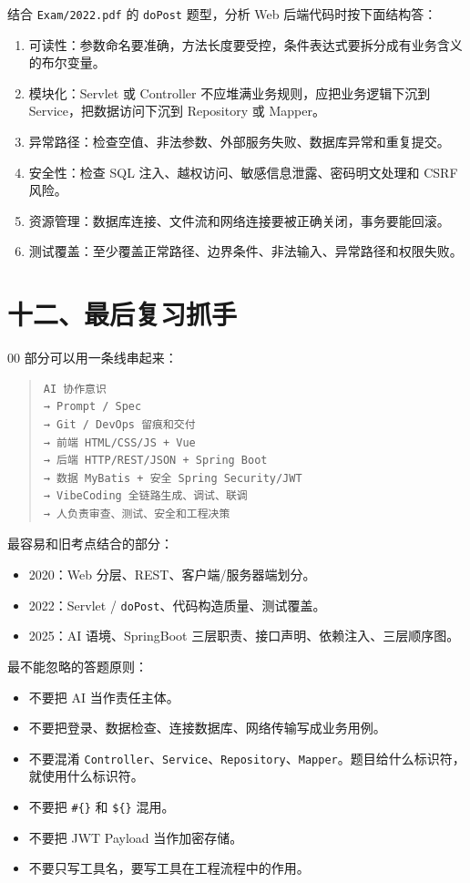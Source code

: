 \documentclass[UTF8,zihao=-4]{ctexart}
\begin{document}
结合 \texttt{Exam/2022.pdf} 的 \texttt{doPost} 题型，分析 Web 后端代码时按下面结构答：

\begin{enumerate}
\item 可读性：参数命名要准确，方法长度要受控，条件表达式要拆分成有业务含义的布尔变量。
\item 模块化：Servlet 或 Controller 不应堆满业务规则，应把业务逻辑下沉到 Service，把数据访问下沉到 Repository 或 Mapper。
\item 异常路径：检查空值、非法参数、外部服务失败、数据库异常和重复提交。
\item 安全性：检查 SQL 注入、越权访问、敏感信息泄露、密码明文处理和 CSRF 风险。
\item 资源管理：数据库连接、文件流和网络连接要被正确关闭，事务要能回滚。
\item 测试覆盖：至少覆盖正常路径、边界条件、非法输入、异常路径和权限失败。
\end{enumerate}

\section{十二、最后复习抓手}

00 部分可以用一条线串起来：

\begin{quote}
\footnotesize
\begin{verbatim}
AI 协作意识
→ Prompt / Spec
→ Git / DevOps 留痕和交付
→ 前端 HTML/CSS/JS + Vue
→ 后端 HTTP/REST/JSON + Spring Boot
→ 数据 MyBatis + 安全 Spring Security/JWT
→ VibeCoding 全链路生成、调试、联调
→ 人负责审查、测试、安全和工程决策
\end{verbatim}
\end{quote}

最容易和旧考点结合的部分：

\begin{itemize}
\item 2020：Web 分层、REST、客户端/服务器端划分。
\item 2022：Servlet / \texttt{doPost}、代码构造质量、测试覆盖。
\item 2025：AI 语境、SpringBoot 三层职责、接口声明、依赖注入、三层顺序图。
\end{itemize}

最不能忽略的答题原则：

\begin{itemize}
\item 不要把 AI 当作责任主体。
\item 不要把登录、数据检查、连接数据库、网络传输写成业务用例。
\item 不要混淆 \texttt{Controller}、\texttt{Service}、\texttt{Repository}、\texttt{Mapper}。题目给什么标识符，就使用什么标识符。
\item 不要把 \texttt{\#\{\}} 和 \texttt{\$\{\}} 混用。
\item 不要把 JWT Payload 当作加密存储。
\item 不要只写工具名，要写工具在工程流程中的作用。
\end{itemize}
\end{document}
